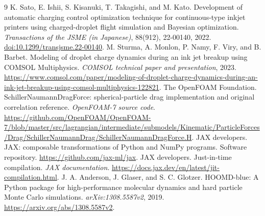 \begin{thebibliography}{9}
K. Sato, E. Ishii, S. Kisanuki, T. Takagishi, and M. Kato.
Development of automatic charging control optimization technique for continuous-type inkjet printers using charged-droplet flight simulation and Bayesian optimization.
\emph{Transactions of the JSME (in Japanese)}, 88(912), 22-00140, 2022.
\href{https://doi.org/10.1299/transjsme.22-00140}{doi:10.1299/transjsme.22-00140}.
M. Sturma, A. Monlon, P. Namy, F. Viry, and B. Barbet.
Modeling of droplet charge dynamics during an ink jet breakup using COMSOL Multiphysics.
\emph{COMSOL technical paper and presentation}, 2023.
\url{https://www.comsol.com/paper/modeling-of-droplet-charge-dynamics-during-an-ink-jet-breakup-using-comsol-multiphysics-122821}.
The OpenFOAM Foundation.
SchillerNaumannDragForce: spherical-particle drag implementation and original correlation reference.
\emph{OpenFOAM-7 source code}.
\url{https://github.com/OpenFOAM/OpenFOAM-7/blob/master/src/lagrangian/intermediate/submodels/Kinematic/ParticleForces/Drag/SchillerNaumannDrag/SchillerNaumannDragForce.H}.
JAX developers.
JAX: composable transformations of Python and NumPy programs.
Software repository. \url{https://github.com/jax-ml/jax}.
JAX developers. Just-in-time compilation. \emph{JAX documentation}.
\url{https://docs.jax.dev/en/latest/jit-compilation.html}.
J. A. Anderson, J. Glaser, and S. C. Glotzer.
HOOMD-blue: A Python package for high-performance molecular dynamics and hard particle Monte Carlo simulations.
\emph{arXiv:1308.5587v2}, 2019.
\url{https://arxiv.org/abs/1308.5587v2}.
\end{thebibliography}

